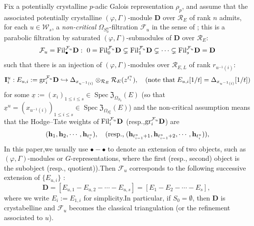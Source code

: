 \documentclass[10pt]{article}
\DeclareMathOperator{\Spec}{Spec}
\newcommand{\fil}{{\rm Fil}}
\newcommand{\gr}{{\rm gr}}
\newcommand{\hpi}{{{\mathbf{h}}}}
\newcommand{\Dpik}{{\mathbf{D}}}
\newcommand{\cR}{\mathcal R}
\newcommand{\cF}{\mathcal F}
\newcommand{\FZ}{{\mathfrak{Z}}}
\newcommand{\sW}{\mathscr W}
\begin{document}
Fix  a potentially crystalline $p$-adic Galois representation $\rho_p$, and assume that the associated potentially crystalline $(\varphi,\Gamma)$-module $\Dpik$ over $\cR_{E}$ of rank $n$ admits, for each $u\in \sW_s$, a \textit{non-critical} $\Omega_{S^u_0}$-filtration $\cF_u$ in the sense of \cite{Ding2021}; this is a parabolic filtration by saturated $(\varphi,\Gamma)$-submodules of $\Dpik$ over $\cR_{E}$:
\[\cF_u=\fil_{\bullet}^{\cF_u}\Dpik: \ 0 =\fil_0^{\cF_u}\Dpik \subsetneq \fil_1^{\cF_u}\Dpik \subsetneq \cdots \subsetneq \fil_{s}^{\cF_u} \Dpik=\Dpik\]
such that there is an injection of $(\varphi,\Gamma)$-modules over $\cR_{E,L}$ of rank $r_{u^{-1}(i)}$:
\begin{equation}
	\mathbf{I}^u_{i}:E_{u,i}:=\gr_{i}^{\cF_u} \Dpik \hookrightarrow \Delta_{x_{u^{-1}(i)}}\otimes_{\cR_E} \cR_{E}(z^{t^u_i}),\quad(\text{note that}\;E_{u,i}[1/t]=\Delta_{x_{u^{-1}(i)}}[1/t])
\end{equation}
for some  $\underline{x}:=(x_{i})_{1\leq i\leq s}\in \Spec\FZ_{\Omega_{S_0}}(E)$ (so that $\underline{x}^u=(x_{u^{-1}(i)})_{1\leq i\leq s}\in \Spec\FZ_{\Omega_{S^u_0}}(E)$)
and the non-critical assumption means that the Hodge--Tate weights of $\fil_{i}^{\cF_u}\Dpik$ (resp.,\;$\gr_{i}^{\cF_u} \Dpik$) are
\[(\hpi_{1},\hpi_{2},\cdots,\hpi_{t_i^u}),\quad (\text{resp.,\;}(\hpi_{t^u_{i-1}+1},\hpi_{t^u_{i-1}+2},\cdots,\hpi_{t_i^u})),\]
In this paper,\;we usually use $\bullet-\bullet$ to denote an extension of two objects, such as $(\varphi,\Gamma)$-modules or $G$-representations, where the first (resp., second) object is the subobject (resp., quotient)).\;Then $\cF_u$ corresponds to the following successive  extension of $\{E_{u,i}\}$ :
\[\Dpik=[{E}_{u,1}-{E}_{u,2}-\cdots-{E}_{u,s}]=[{E}_{1}-{E}_{2}-\cdots-{E}_{s}],\;\]
where we write $E_i:=E_{1,i}$ for simplicity.\;In particular, if $S_0=\emptyset$, then $\Dpik$ is crystabelline and $\cF_u$ becomes the classical triangulation (or the refinement associated to $u$).\;
\end{document}
